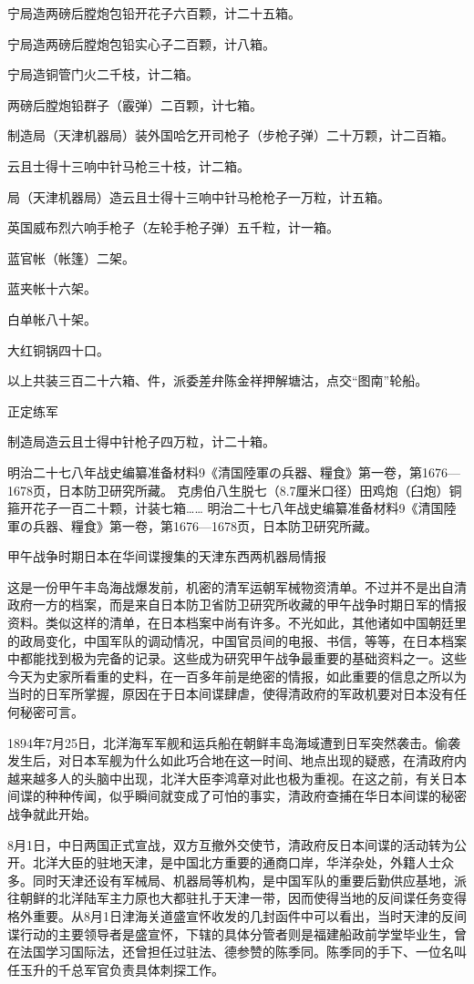 \documentclass[12pt,UTF8]{ctexbook}
\begin{document}
宁局造两磅后膛炮包铅开花子六百颗，计二十五箱。

宁局造两磅后膛炮包铅实心子二百颗，计八箱。

宁局造铜管门火二千枝，计二箱。

两磅后膛炮铅群子（霰弹）二百颗，计七箱。

制造局（天津机器局）装外国哈乞开司枪子（步枪子弹）二十万颗，计二百箱。

云且士得十三响中针马枪三十枝，计二箱。

局（天津机器局）造云且士得十三响中针马枪枪子一万粒，计五箱。

英国威布烈六响手枪子（左轮手枪子弹）五千粒，计一箱。

蓝官帐（帐篷）二架。

蓝夹帐十六架。

白单帐八十架。

大红铜锅四十口。

以上共装三百二十六箱、件，派委差弁陈金祥押解塘沽，点交“图南”轮船。

正定练军

制造局造云且士得中针枪子四万粒，计二十箱。

明治二十七八年战史编纂准备材料9《清国陸軍の兵器、糧食》第一卷，第1676—1678页，日本防卫研究所藏。
克虏伯八生脱七（8.7厘米口径）田鸡炮（臼炮）铜箍开花子一百二十颗，计装七箱…… 明治二十七八年战史编纂准备材料9《清国陸軍の兵器、糧食》第一卷，第1676—1678页，日本防卫研究所藏。


甲午战争时期日本在华间谍搜集的天津东西两机器局情报

这是一份甲午丰岛海战爆发前，机密的清军运朝军械物资清单。不过并不是出自清政府一方的档案，而是来自日本防卫省防卫研究所收藏的甲午战争时期日军的情报资料。类似这样的清单，在日本档案中尚有许多。不光如此，其他诸如中国朝廷里的政局变化，中国军队的调动情况，中国官员间的电报、书信，等等，在日本档案中都能找到极为完备的记录。这些成为研究甲午战争最重要的基础资料之一。这些今天为史家所看重的史料，在一百多年前是绝密的情报，如此重要的信息之所以为当时的日军所掌握，原因在于日本间谍肆虐，使得清政府的军政机要对日本没有任何秘密可言。

1894年7月25日，北洋海军军舰和运兵船在朝鲜丰岛海域遭到日军突然袭击。偷袭发生后，对日本军舰为什么如此巧合地在这一时间、地点出现的疑惑，在清政府内越来越多人的头脑中出现，北洋大臣李鸿章对此也极为重视。在这之前，有关日本间谍的种种传闻，似乎瞬间就变成了可怕的事实，清政府查捕在华日本间谍的秘密战争就此开始。

8月1日，中日两国正式宣战，双方互撤外交使节，清政府反日本间谍的活动转为公开。北洋大臣的驻地天津，是中国北方重要的通商口岸，华洋杂处，外籍人士众多。同时天津还设有军械局、机器局等机构，是中国军队的重要后勤供应基地，派往朝鲜的北洋陆军主力原也大都驻扎于天津一带，因而使得当地的反间谍任务变得格外重要。从8月1日津海关道盛宣怀收发的几封函件中可以看出，当时天津的反间谍行动的主要领导者是盛宣怀，下辖的具体分管者则是福建船政前学堂毕业生，曾在法国学习国际法，还曾担任过驻法、德参赞的陈季同。陈季同的手下、一位名叫任玉升的千总军官负责具体刺探工作。
\end{document}
